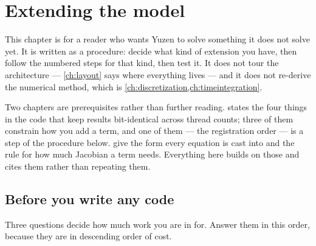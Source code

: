 \chapter{Extending the model}
\label{ch:extending}

This chapter is for a reader who wants Yuzen to solve something it does not
solve yet. It is written as a procedure: decide what kind of extension you
have, then follow the numbered steps for that kind, then test it. It does not
tour the architecture --- \cref{ch:layout} says where everything lives --- and
it does not re-derive the numerical method, which is
\cref{ch:discretization,ch:timeintegration}.

Two chapters are prerequisites rather than further reading.
 states the four things in the code that keep results
bit-identical across thread counts; three of them constrain how you add a term,
and one of them --- the registration order --- is a step of the procedure below.
 give the form every equation is cast
into and the rule for how much Jacobian a term needs. Everything here builds on
those and cites them rather than repeating them.

\section{Before you write any code}
\label{sec:extending:decide}

Three questions decide how much work you are in for. Answer them in this
order, because they are in descending order of cost.

